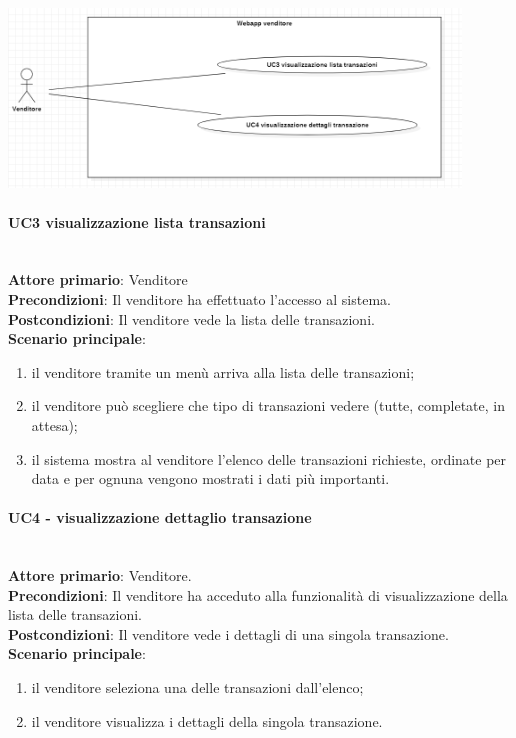 \documentclass[a4paper, 12pt]{article}
\begin{document}
\includegraphics[width=0.9\textwidth]{UseCase_venditore3.png}

\paragraph{UC3 visualizzazione lista transazioni}\\
\textbf{Attore primario}: Venditore \\
\textbf{Precondizioni}: Il venditore ha effettuato l'accesso al sistema.\\
\textbf{Postcondizioni}:  Il venditore vede la lista delle transazioni.\\
\textbf{Scenario principale}:
\begin{enumerate}
\item il venditore tramite un menù arriva alla lista delle transazioni;
\item il venditore può scegliere che tipo di transazioni vedere (tutte, completate, in attesa);
\item il sistema mostra al venditore l'elenco delle transazioni richieste, ordinate per data e per ognuna vengono mostrati i dati più importanti.
\end{enumerate}

\paragraph{UC4 - visualizzazione dettaglio transazione}\\
\textbf{Attore primario}: Venditore.\\
\textbf{Precondizioni}: Il venditore ha acceduto alla funzionalità di visualizzazione della lista delle transazioni.\\
\textbf{Postcondizioni}: Il venditore vede i dettagli di una singola transazione.\\
\textbf{Scenario principale}:
\begin{enumerate}
\item il venditore seleziona una delle transazioni dall'elenco;
\item il venditore visualizza i dettagli della singola transazione.
\end{enumerate}
\end{document}
